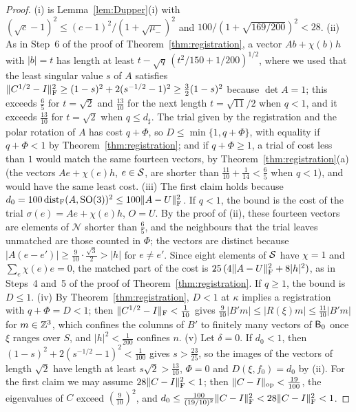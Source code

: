 \begin{proof}
(i) is Lemma~\ref{lem:Dupper}(i) with $(\sqrt c-1)^2\le(c-1)^2/(1+\sqrt{\mu_-})^2$ and $100/(1+\sqrt{169/200})^2<28$. (ii) As in Step~6
of the proof of Theorem~\ref{thm:registration}, a vector $Ab+\chi(b)h$ with $|b|=t$ has length at least
$t-\sqrt q\,(t^2/150+1/200)^{1/2}$, where we used that the least singular value $s$ of $A$ satisfies
$\|C^{1/2}-I\|_\mathrm F^2\ge(1-s)^2+2(s^{-1/2}-1)^2\ge\frac32(1-s)^2$ because $\det A=1$; this exceeds $\frac65$ for $t=\sqrt2$ and
$\frac{13}{10}$ for the next length $t=\sqrt{11}/2$ when $q<1$, and it exceeds $\frac{13}{10}$ for $t=\sqrt2$ when $q\le d_\sharp$. The
trial given by the registration and the polar rotation of $A$ has cost $q+\Phi$, so $D\le\min\{1,q+\Phi\}$, with equality if
$q+\Phi<1$ by Theorem~\ref{thm:registration}; and if $q+\Phi\ge1$, a trial of cost less than $1$ would match the same fourteen
vectors, by Theorem~\ref{thm:registration}(a) (the vectors $Ae+\chi(e)h$, $e\in\mathcal S$, are shorter than
$\frac{11}{10}+\frac1{14}<\frac65$ when $q<1$), and would have the same least cost. (iii) The first claim holds because
$d_0=100\operatorname{dist}_\mathrm F(A,\mathrm{SO}(3))^2\le100\|A-U\|_\mathrm F^2$. If $q<1$, the bound is the cost of the trial $\sigma(e)=Ae+\chi(e)h$, $O=U$.
By the proof of (ii), these fourteen vectors are elements of $\mathcal N$ shorter than $\frac65$, and the neighbours that the trial
leaves unmatched are those counted in $\Phi$; the vectors are distinct because $|A(e-e')|\ge\frac9{10}\cdot\frac{\sqrt3}2>|h|$ for
$e\ne e'$. Since eight elements of $\mathcal S$ have $\chi=1$ and $\sum_e\chi(e)e=0$, the matched part of the cost is
$25\,(4\|A-U\|_\mathrm F^2+8|h|^2)$, as in Steps~4 and~5 of the proof of Theorem~\ref{thm:registration}. If $q\ge1$, the bound is
$D\le1$. (iv) By Theorem~\ref{thm:registration},
$D<1$ at $\kappa$ implies a registration with $q+\Phi=D<1$; then $\|C^{1/2}-I\|_\mathrm F<\frac1{10}$ gives
$\frac9{10}|B'm|\le|R(\xi)m|\le\frac{11}{10}|B'm|$ for $m\in\mathbb Z^3$, which confines the columns of $B'$ to finitely many vectors of $\mathsf B_0$
once $\xi$ ranges over $S$, and $|h|^2<\frac1{200}$ confines $n$. (v) Let $\delta=0$. If $d_0<1$, then
$(1-s)^2+2(s^{-1/2}-1)^2<\frac1{100}$ gives $s>\frac{23}{25}$, so the images of the vectors of length $\sqrt2$ have length at least
$s\sqrt2>\frac{13}{10}$, $\Phi=0$ and $D(\xi,f_0)=d_0$ by (ii). For the first claim we may assume $28\|C-I\|_\mathrm F^2<1$; then
$\|C-I\|_{\mathrm{op}}<\frac{19}{100}$, the eigenvalues of $C$ exceed $(\frac9{10})^2$, and
$d_0\le\frac{100}{(19/10)^2}\|C-I\|_\mathrm F^2<28\|C-I\|_\mathrm F^2<1$.
\end{proof}

